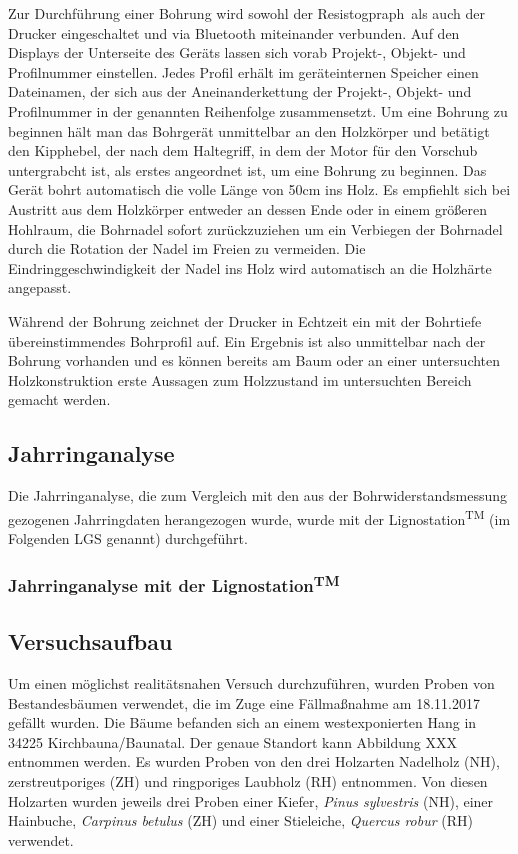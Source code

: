 \documentclass[a4paper, halfparskip]{article}
\def\SymbReg{\textsuperscript{\textregistered}}
\begin{document}
Zur Durchführung einer Bohrung wird sowohl der Resistogpraph\SymbReg\ als auch
der Drucker eingeschaltet und via Bluetooth miteinander verbunden. Auf den
Displays der Unterseite des Geräts lassen sich vorab Projekt-, Objekt- und
Profilnummer einstellen. Jedes Profil erhält im geräteinternen Speicher einen
Dateinamen, der sich aus der Aneinanderkettung der Projekt-, Objekt- und
Profilnummer in der genannten Reihenfolge zusammensetzt. Um eine Bohrung zu
beginnen hält man das Bohrgerät unmittelbar an den Holzkörper und betätigt
den Kipphebel, der nach dem Haltegriff, in dem der Motor für den Vorschub
untergrabcht ist, als erstes angeordnet ist, um eine Bohrung zu beginnen. Das
Gerät bohrt automatisch die volle Länge von 50cm ins Holz. Es empfiehlt sich
bei Austritt aus dem Holzkörper entweder an dessen Ende oder in einem größeren
Hohlraum, die Bohrnadel sofort zurückzuziehen um ein Verbiegen der Bohrnadel
durch die Rotation der Nadel im Freien zu vermeiden.  Die
Eindringgeschwindigkeit der Nadel ins Holz wird automatisch an die Holzhärte
angepasst.

Während der Bohrung zeichnet der Drucker in Echtzeit ein mit der Bohrtiefe
übereinstimmendes Bohrprofil auf. Ein Ergebnis ist also unmittelbar nach der
Bohrung vorhanden und es können bereits am Baum oder an einer untersuchten
Holzkonstruktion erste Aussagen zum Holzzustand im untersuchten Bereich
gemacht werden.

\subsection{Jahrringanalyse}
Die Jahrringanalyse, die zum Vergleich mit den aus der Bohrwiderstandsmessung
gezogenen Jahrringdaten herangezogen wurde, wurde mit der
Lignostation\textsuperscript{TM} (im Folgenden LGS genannt) durchgeführt.

\subsubsection{Jahrringanalyse mit der Lignostation\textsuperscript{TM}}


\subsection{Versuchsaufbau}
Um einen möglichst realitätsnahen Versuch durchzuführen, wurden Proben von
Bestandesbäumen verwendet, die im Zuge eine Fällmaßnahme am 18.11.2017 gefällt
wurden. Die Bäume befanden sich an einem westexponierten Hang in 34225
Kirchbauna/Baunatal. Der genaue Standort kann Abbildung XXX entnommen werden.
Es wurden Proben von den drei Holzarten Nadelholz (NH), zerstreutporiges (ZH)
und ringporiges Laubholz (RH) entnommen.  Von diesen Holzarten wurden jeweils
drei Proben einer Kiefer, \textit{Pinus sylvestris} (NH), einer Hainbuche,
\textit{Carpinus betulus} (ZH) und einer Stieleiche, \textit{Quercus robur}
(RH) verwendet.
\end{document}
